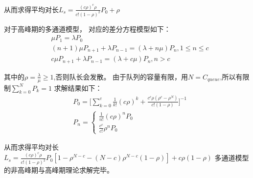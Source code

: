 从而求得平均对长$L_s=\frac{(c\rho)^c\rho}{c!(1-\rho)^2}P_0+\rho$

对于高峰期的多通道模型，
对应的差分方程模型如下：
\begin{equation}
    \begin{aligned}
        &\mu P_1=\lambda P_0 \\
        &(n+1)\mu P_{n+1}+\lambda P_{n-1}=(\lambda+n\mu)P_n, 1\leq n\leq c \\
        &c\mu P_{n+1}+\lambda P_{n-1}=(\lambda +c\mu )P_n, n>c
    \end{aligned}
\end{equation}

其中的$\rho=\frac{\lambda}{\mu}\geq 1$,否则队长会发散。
由于队列的容量有限，用$N=C_{queue}$,所以有限制$\sum_{k=0}^{N}P_k=1$
求解结果如下：
\begin{equation}
    \begin{aligned}
        &P_0=\Big[\sum_{k=0}^{c}\frac{1}{k!} (c\rho)^k +\frac{c^c\rho (\rho^c-\rho^N)}{c!(1-\rho)} \Big]^{-1} \\
        &P_n=
        \begin{cases}
            \frac{1}{n!}(c\rho)^n P_0 \\
            \frac{c^c}{c!}\rho^n P_0
        \end{cases}
    \end{aligned}
\end{equation}

从而求得平均对长$L_s=\frac{(c\rho)^c\rho}{c!(1-\rho)^2}P_0[1-\rho^{N-c}-(N-c)\rho^{N-c}(1-\rho)]+c\rho (1-\rho)$
多通道模型的非高峰期与高峰期理论求解完毕。

